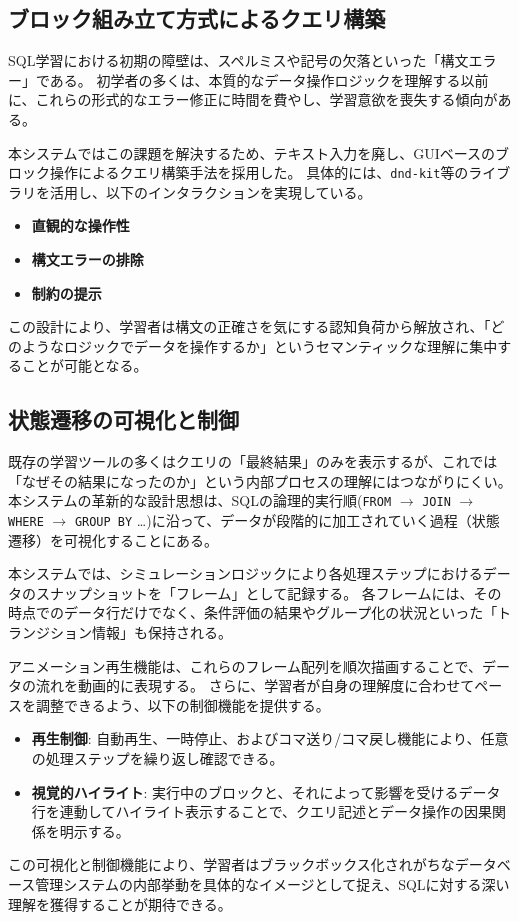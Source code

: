 \documentclass[uplatex,a4paper,12pt]{ujreport}
\begin{document}
\subsection{ブロック組み立て方式によるクエリ構築}
SQL学習における初期の障壁は、スペルミスや記号の欠落といった「構文エラー」である。
初学者の多くは、本質的なデータ操作ロジックを理解する以前に、これらの形式的なエラー修正に時間を費やし、学習意欲を喪失する傾向がある。
\par
本システムではこの課題を解決するため、テキスト入力を廃し、GUIベースのブロック操作によるクエリ構築手法を採用した。
具体的には、\texttt{dnd-kit}等のライブラリを活用し、以下のインタラクションを実現している。
\begin{itemize}
  \item \textbf{直観的な操作性}
  \item \textbf{構文エラーの排除}
  \item \textbf{制約の提示}
\end{itemize}
この設計により、学習者は構文の正確さを気にする認知負荷から解放され、「どのようなロジックでデータを操作するか」というセマンティックな理解に集中することが可能となる。
\subsection{状態遷移の可視化と制御}
既存の学習ツールの多くはクエリの「最終結果」のみを表示するが、これでは「なぜその結果になったのか」という内部プロセスの理解にはつながりにくい。
本システムの革新的な設計思想は、SQLの論理的実行順(\texttt{FROM} $\rightarrow$ \texttt{JOIN} $\rightarrow$ \texttt{WHERE} $\rightarrow$ \texttt{GROUP BY} \dots)に沿って、データが段階的に加工されていく過程（状態遷移）を可視化することにある。
\par
本システムでは、シミュレーションロジックにより各処理ステップにおけるデータのスナップショットを「フレーム」として記録する。
各フレームには、その時点でのデータ行だけでなく、条件評価の結果やグループ化の状況といった「トランジション情報」も保持される。
\par
アニメーション再生機能は、これらのフレーム配列を順次描画することで、データの流れを動画的に表現する。
さらに、学習者が自身の理解度に合わせてペースを調整できるよう、以下の制御機能を提供する。
\begin{itemize}
  \item \textbf{再生制御}: 自動再生、一時停止、およびコマ送り/コマ戻し機能により、任意の処理ステップを繰り返し確認できる。
  \item \textbf{視覚的ハイライト}: 実行中のブロックと、それによって影響を受けるデータ行を連動してハイライト表示することで、クエリ記述とデータ操作の因果関係を明示する。
\end{itemize}
\par
この可視化と制御機能により、学習者はブラックボックス化されがちなデータベース管理システムの内部挙動を具体的なイメージとして捉え、SQLに対する深い理解を獲得することが期待できる。
\end{document}
